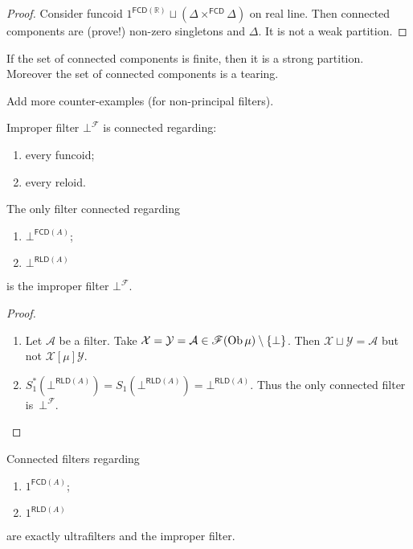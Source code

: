 \begin{proof}
  Consider funcoid $1^{\mathsf{FCD}(\mathbb{R})}\sqcup(\Delta \times^{\mathsf{FCD}} \Delta)$ on real line.
  Then connected components are (prove!) non-zero singletons and $\Delta$. It
  is not a weak partition.
\end{proof}

\begin{conjecture}
If the set of connected components is finite, then it is
a strong partition. Moreover the set of connected
components is a tearing.
\end{conjecture}

Add more counter-examples (for non-principal filters).

\begin{obvious}
Improper filter $\bot^{\mathscr{F}}$ is connected regarding:
\begin{enumerate}
  \item every funcoid;
  \item every reloid.
\end{enumerate}{\hspace*{\fill}}{\medskip}
\end{obvious}

\begin{prop}
  The only filter connected regarding
  \begin{enumerate}
    \item $\bot^{\mathsf{FCD} (A)}$;
    \item $\bot^{\mathsf{RLD} (A)}$
  \end{enumerate}
  is the improper filter $\bot^{\mathscr{F}}$.
\end{prop}

\begin{proof}
  ~
  \begin{enumerate}
    \item Let $\mathcal{A}$ be a filter. Take $\mathcal{X} = \mathcal{Y} =
    \mathcal{A} \in \mathscr{F} (\operatorname{Ob} \mu) \setminus \{ \bot \}$. Then
    $\mathcal{X} \sqcup \mathcal{Y} = \mathcal{A}$ but not $\mathcal{X}
    \mathrel{[\mu]} \mathcal{Y}$.

    \item $S^{\ast}_1 (\bot^{\mathsf{RLD} (A)}) = S_1
    (\bot^{\mathsf{RLD} (A)}) = \bot^{\mathsf{RLD} (A)}$. Thus
    the only connected filter is~$\bot^{\mathscr{F}}$.
  \end{enumerate}
\end{proof}

\begin{prop}
  Connected filters regarding
  \begin{enumerate}
    \item $1^{\mathsf{FCD} (A)}$;

    \item $1^{\mathsf{RLD} (A)}$
  \end{enumerate}
  are exactly ultrafilters and the improper filter.
\end{prop}

